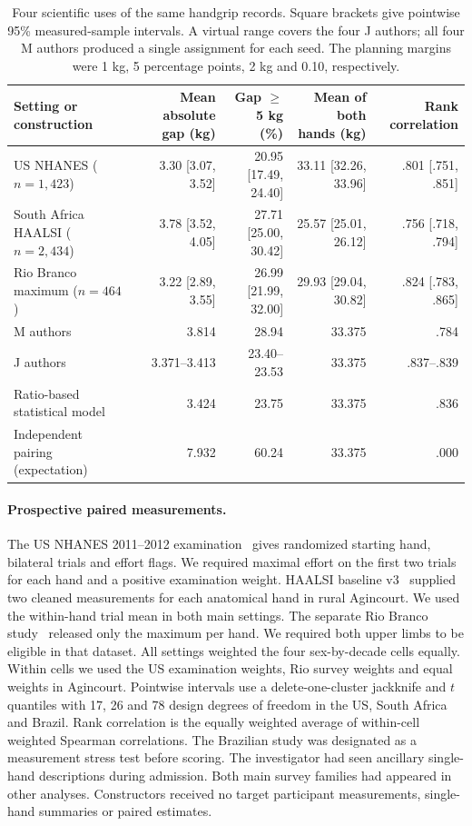 \begin{table}[t]
\caption{Four scientific uses of the same handgrip records. Square brackets give pointwise 95\% measured-sample intervals. A virtual range covers the four J authors; all four M authors produced a single assignment for each seed. The planning margins were 1 kg, 5 percentage points, 2 kg and 0.10, respectively.}
\label{tab:grip}
\centering\small
\begin{tabular}{lrrrr}\toprule
Setting or construction & Mean absolute gap (kg) & Gap $\geq$5 kg (\%) & Mean of both hands (kg) & Rank correlation\\\midrule
US NHANES ($n=1{,}423$) & 3.30 [3.07, 3.52] & 20.95 [17.49, 24.40] & 33.11 [32.26, 33.96] & .801 [.751, .851]\\
South Africa HAALSI ($n=2{,}434$) & 3.78 [3.52, 4.05] & 27.71 [25.00, 30.42] & 25.57 [25.01, 26.12] & .756 [.718, .794]\\
Rio Branco maximum ($n=464$) & 3.22 [2.89, 3.55] & 26.99 [21.99, 32.00] & 29.93 [29.04, 30.82] & .824 [.783, .865]\\\midrule
M authors & 3.814 & 28.94 & 33.375 & .784\\
J authors & 3.371--3.413 & 23.40--23.53 & 33.375 & .837--.839\\
Ratio-based statistical model & 3.424 & 23.75 & 33.375 & .836\\
Independent pairing (expectation) & 7.932 & 60.24 & 33.375 & .000\\\bottomrule
\end{tabular}
\end{table}



\paragraph{Prospective paired measurements.}
The US NHANES 2011--2012 examination~\cite{grip_cdc} gives randomized starting hand, bilateral trials and effort flags. We required maximal effort on the first two trials for each hand and a positive examination weight. HAALSI baseline v3~\cite{grip_haalsi} supplied two cleaned measurements for each anatomical hand in rural Agincourt. We used the within-hand trial mean in both main settings. The separate Rio Branco study~\cite{grip_rio} released only the maximum per hand. We required both upper limbs to be eligible in that dataset. All settings weighted the four sex-by-decade cells equally. Within cells we used the US examination weights, Rio survey weights and equal weights in Agincourt. Pointwise intervals use a delete-one-cluster jackknife and $t$ quantiles with 17, 26 and 78 design degrees of freedom in the US, South Africa and Brazil. Rank correlation is the equally weighted average of within-cell weighted Spearman correlations. The Brazilian study was designated as a measurement stress test before scoring. The investigator had seen ancillary single-hand descriptions during admission. Both main survey families had appeared in other analyses. Constructors received no target participant measurements, single-hand summaries or paired estimates.

